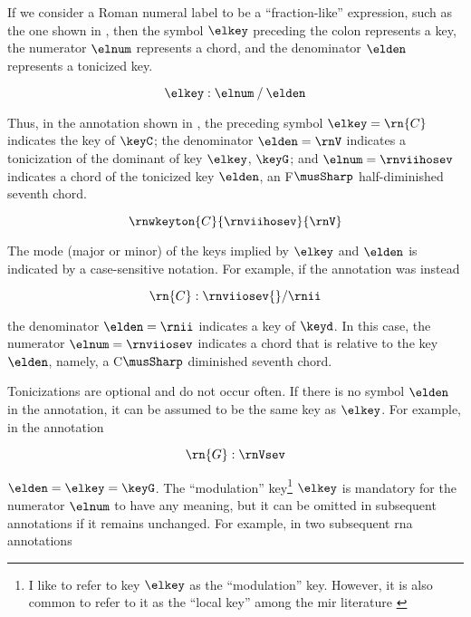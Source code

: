 
If we consider a Roman numeral label to be a
``fraction-like'' expression, such as the one shown in
, then the symbol $\elkey$ preceding
the colon represents a key, the numerator $\elnum$
represents a chord, and the denominator $\elden$ represents
a tonicized key.

\begin{equation}
    \label{eq:rn_expression}
    \elkey : \elnum \: / \: \elden
\end{equation}

Thus, in the annotation shown in , the
preceding symbol $\elkey=\rn{C}$ indicates the key of
$\keyC$; the denominator $\elden = \rnV$ indicates a
tonicization of the dominant of key $\elkey$, $\keyG$; and
$\elnum=\rnviihosev$ indicates a chord of the tonicized key
$\elden$, an F$\musSharp$ half-diminished seventh chord.

\begin{equation}
    \label{eq:rn_example1}
    \rnwkeyton{C}{\rnviihosev}{\rnV}
\end{equation}


The mode (major or minor) of the keys implied by $\elkey$
and $\elden$ is indicated by a case-sensitive notation. For
example, if the annotation was instead

\begin{equation}
    \rn{C}:\rnviiosev{}/\rnii
\end{equation}

the denominator $\elden=\rnii$ indicates a key of $\keyd$.
In this case, the numerator $\elnum = \rnviiosev$ indicates
a chord that is relative to the key $\elden$, namely, a
C$\musSharp$ diminished seventh chord.

Tonicizations are optional and do not occur often. If there
is no symbol $\elden$ in the annotation, it can be assumed
to be the same key as $\elkey$. For example, in the
annotation

\begin{equation}
    \rn{G}:\rnVsev
\end{equation}

$\elden = \elkey = \keyG$. The ``modulation'' key\footnote{I
like to refer to key $\elkey$ as the ``modulation'' key.
However, it is also common to refer to it as the ``local
key'' among the \gls{mir} literature
\parencite{napoleslopez2020local}} $\elkey$ is mandatory for
the numerator $\elnum$ to have any meaning, but it can be
omitted in subsequent annotations if it remains unchanged.
For example, in two subsequent \gls{rna} annotations

